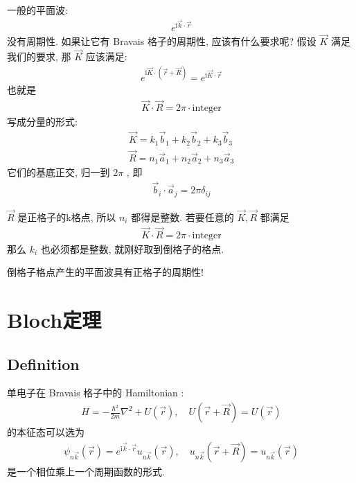 \documentclass{ctexart}
\begin{document}
一般的平面波:
\begin{align*}
  e^{\mathrm{i}\vec{k}\cdot \vec{r}}
\end{align*}
没有周期性. 如果让它有 Bravais 格子的周期性, 应该有什么要求呢? 假设 $\vec{K}$
满足我们的要求, 那 $\vec{K}$ 应该满足:
\begin{align*}
  e^{\mathrm{i} \vec{K}\cdot(\vec{r}+\vec{R})} = e^{\mathrm{i}\vec{K}\cdot \vec{r}}
\end{align*}
也就是
\begin{align*}
  \vec{K} \cdot \vec{R} = 2\pi \cdot \mathrm{integer}
\end{align*}
写成分量的形式:
\begin{align*}
  \vec{K} = k_1 \vec{b}_1 + k_2 \vec{b}_2 +k_3 \vec{b}_3 \\
  \vec{R} = n_1 \vec{a}_1 + n_2 \vec{a}_2 +n_3 \vec{a}_3
\end{align*}
它们的基底正交, 归一到 $2\pi$ , 即
\begin{align*}
  \vec{b}_i \cdot \vec{a}_j = 2\pi \delta_{ij}
\end{align*}

$\vec{R}$ 是正格子的k格点, 所以 $n_i$ 都得是整数. 若要任意的 $\vec{K}, \vec{R}$
 都满足
\begin{align*}
  \vec{K} \cdot \vec{R} = 2\pi \cdot \mathrm{integer}
\end{align*}
那么 $k_i$ 也必须都是整数, 就刚好取到倒格子的格点.

倒格子格点产生的平面波具有正格子的周期性!







\section{Bloch定理}

\subsection{Definition}

单电子在 Bravais 格子中的 Hamiltonian :
\begin{align*}
  H = - \frac{\hbar^2}{2m}\nabla ^2 + U(\vec{r}), \quad U(\vec{r}+\vec{R}) = U (\vec{r})
\end{align*}
的本征态可以选为
\begin{align*}
  \psi_{n\vec{k}} (\vec{r}) = e^{\mathrm{i}\vec{k} \cdot \vec{r}} u_{n\vec{k}}(\vec{r}),
  \quad u_{n\vec{k}} (\vec{r}+\vec{R}) = u_{n\vec{k}}(\vec{r})
\end{align*}
是一个相位乘上一个周期函数的形式.
\end{document}
